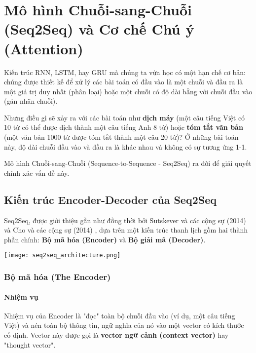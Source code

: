
\section{Mô hình Chuỗi-sang-Chuỗi (Seq2Seq) và Cơ chế Chú ý (Attention)}
\label{sec:seq2seq_attention}

Kiến trúc RNN, LSTM, hay GRU mà chúng ta vừa học có một hạn chế cơ bản: chúng được thiết kế để xử lý các bài toán có đầu vào là một chuỗi và đầu ra là một giá trị duy nhất (phân loại) hoặc một chuỗi có độ dài bằng với chuỗi đầu vào (gán nhãn chuỗi).

Nhưng điều gì sẽ xảy ra với các bài toán như \textbf{dịch máy} (một câu tiếng Việt có 10 từ có thể được dịch thành một câu tiếng Anh 8 từ) hoặc \textbf{tóm tắt văn bản} (một văn bản 1000 từ được tóm tắt thành một câu 20 từ)? Ở những bài toán này, độ dài chuỗi đầu vào và đầu ra là khác nhau và không có sự tương ứng 1-1.

Mô hình Chuỗi-sang-Chuỗi (Sequence-to-Sequence - Seq2Seq) ra đời để giải quyết chính xác vấn đề này.

\subsection{Kiến trúc Encoder-Decoder của Seq2Seq}
\label{ssec:encoder_decoder}
Seq2Seq, được giới thiệu gần như đồng thời bởi Sutskever và các cộng sự (2014) \cite{sutskever2014sequence} và Cho và các cộng sự (2014) \cite{cho2014learning}, dựa trên một kiến trúc thanh lịch gồm hai thành phần chính: \textbf{Bộ mã hóa (Encoder)} và \textbf{Bộ giải mã (Decoder)}.

\begin{center}
    \texttt{[image: seq2seq\_architecture.png]}
    \label{fig:seq2seq_architecture}
\end{center}

\subsubsection{Bộ mã hóa (The Encoder)}
\paragraph{Nhiệm vụ}
Nhiệm vụ của Encoder là "đọc" toàn bộ chuỗi đầu vào (ví dụ, một câu tiếng Việt) và nén toàn bộ thông tin, ngữ nghĩa của nó vào một vector có kích thước cố định. Vector này được gọi là \textbf{vector ngữ cảnh (context vector)} hay "thought vector".

